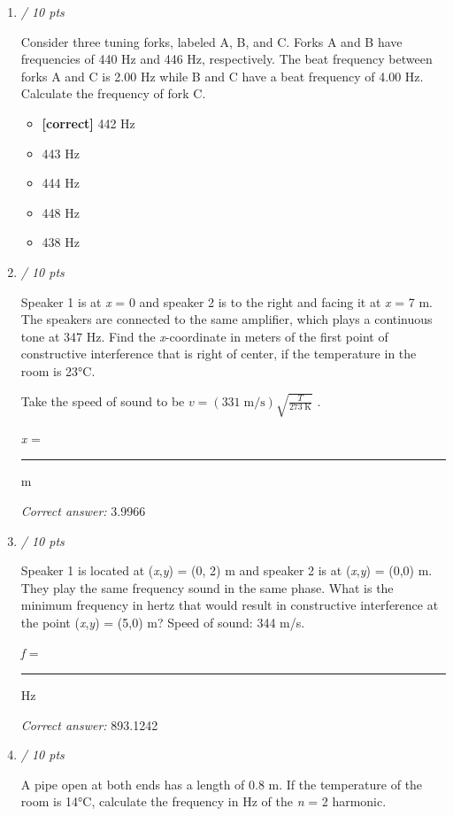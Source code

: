 \documentclass[11pt]{article}
\begin{document}
\begin{enumerate}[leftmargin=*,label=\textbf{Question \arabic*.}]
\textit{Correct answer: } 94.8945

\item \hfill \textit{/ 10 pts}

Consider three tuning forks, labeled A, B, and C. Forks A and B have frequencies of 440 Hz and 446 Hz, respectively. The beat frequency between forks A and C is 2.00 Hz while B and C have a beat frequency of 4.00 Hz. Calculate the frequency of fork C.

\begin{itemize}
  \item \textbf{[correct]} 442 Hz
  \item 443 Hz
  \item 444 Hz
  \item 448 Hz
  \item 438 Hz
\end{itemize}

\item \hfill \textit{/ 10 pts}

Speaker 1 is at \emph{x} = 0 and speaker 2 is to the right and facing it at \emph{x} = 7 m. The speakers are connected to the same amplifier, which plays a continuous tone at 347 Hz. Find the \emph{x}-coordinate in meters of the first point of constructive interference that is right of center, if the temperature in the room is 23°C.

Take the speed of sound to be $v=(331\;\mathrm{m/s})\sqrt{\frac{T}{273\;\mathrm{K}}}$ .



\emph{x} = \rule{2cm}{0.4pt} m

\textit{Correct answer: } 3.9966

\item \hfill \textit{/ 10 pts}

Speaker 1 is located at (\emph{x},\emph{y}) = (0, 2) m and speaker 2 is at (\emph{x},\emph{y}) = (0,0) m. They play the same frequency sound in the same phase. What is the minimum frequency in hertz that would result in constructive interference at the point (\emph{x},\emph{y}) = (5,0) m? Speed of sound: 344 m/s.



\emph{f} = \rule{2cm}{0.4pt} Hz

\textit{Correct answer: } 893.1242

\item \hfill \textit{/ 10 pts}

A pipe open at both ends has a length of 0.8 m. If the temperature of the room is 14°C, calculate the frequency in Hz of the \emph{n} = 2 harmonic.


\end{enumerate}
\end{document}
